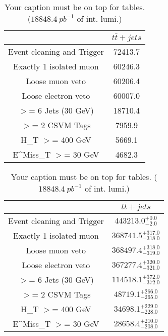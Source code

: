 \documentclass{article}
\begin{document}
\begin{table}
\caption{Your caption must be on top for tables. ($18848.4~pb^{-1}$ of int. lumi.)}
\label{tab:}
\centering
\begin{tabular}{|c|c|}
\toprule
&$t\bar{t}+jets$	\\

\midrule
Event cleaning and Trigger&	72413.7	\\

Exactly 1 isolated muon&	60246.3	\\

Loose muon veto&	60206.4	\\

Loose electron veto&	60007.0	\\

$>$= 6 Jets (30 GeV)&	18710.4	\\

$>$= 2 CSVM Tags&	7959.9	\\

H_{T} $>$=  400 GeV&	5669.1	\\

E^{Miss}_{T} $>$=  30 GeV&	4682.3	\\

\bottomrule
\end{tabular}
\end{table}
\begin{table}
\caption{Your caption must be on top for tables. ($18848.4~pb^{-1}$ of int. lumi.)}
\label{tab:}
\centering
\begin{tabular}{|c|c|}
\toprule
&$t\bar{t}+jets$	\\

\midrule
Event cleaning and Trigger&	$443213.0^{+0.0}_{-2.0}$	\\

Exactly 1 isolated muon&	$368741.5^{+317.0}_{-318.0}$	\\

Loose muon veto&	$368497.4^{+318.0}_{-319.0}$	\\

Loose electron veto&	$367277.4^{+320.0}_{-321.0}$	\\

$>$= 6 Jets (30 GeV)&	$114518.1^{+372.0}_{-372.0}$	\\

$>$= 2 CSVM Tags&	$48719.1^{+266.0}_{-265.0}$	\\

H_{T} $>$=  400 GeV&	$34698.1^{+229.0}_{-228.0}$	\\

E^{Miss}_{T} $>$=  30 GeV&	$28658.4^{+210.0}_{-208.0}$	\\

\bottomrule
\end{tabular}
\end{table}
\end{document}
